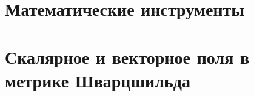 \documentclass[12pt,a4paper]{article}
\def\docroot{../..}
\begin{document}
\begin{appendix}
        \section{Математические инструменты}
        

        \section{Скалярное и векторное поля в метрике Шварцшильда}
        

    \end{appendix}

    \clearpage

    
    
\end{document}
